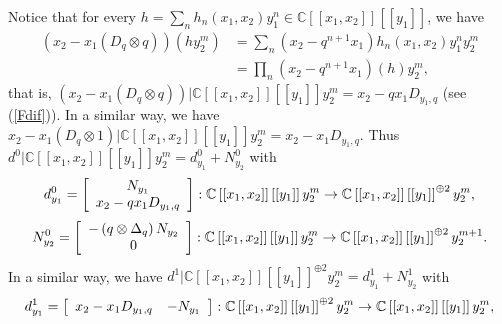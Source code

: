 \documentclass[12pt,reqno]{amsart}%
\theoremstyle{plain}
\numberwithin{theorem}{section} \numberwithin{equation}{section}
\numberwithin{lemma}{section}
\numberwithin{remark}{section}
\numberwithin{example}{section}
\numberwithin{proposition}{section}
\numberwithin{definition}{section}
\numberwithin{corollary}{section}
\begin{document}
Notice that for every $h=\sum_{n}h_{n}\left(  x_{1},x_{2}\right)  y_{1}^{n}%
\in\mathbb{C}\left[  \left[  x_{1},x_{2}\right]  \right]  \left[  \left[
y_{1}\right]  \right]  $, we have
\begin{align*}
\left(  x_{2}-x_{1}\left(  D_{q}\otimes q\right)  \right)  \left(  hy_{2}%
^{m}\right)   &  =\sum_{n}\left(  x_{2}-q^{n+1}x_{1}\right)  h_{n}\left(
x_{1},x_{2}\right)  y_{1}^{n}y_{2}^{m}\\
&  =\prod\limits_{n}\left(  x_{2}-q^{n+1}x_{1}\right)  \left(  h\right)
y_{2}^{m},
\end{align*}
that is, $\left(  x_{2}-x_{1}\left(  D_{q}\otimes q\right)  \right)
|\mathbb{C}\left[  \left[  x_{1},x_{2}\right]  \right]  \left[  \left[
y_{1}\right]  \right]  y_{2}^{m}=x_{2}-qx_{1}D_{y_{1},q}$ (see (\ref{Fdif})).
In a similar way, we have $x_{2}-x_{1}\left(  D_{q}\otimes1\right)
|\mathbb{C}\left[  \left[  x_{1},x_{2}\right]  \right]  \left[  \left[
y_{1}\right]  \right]  y_{2}^{m}=x_{2}-x_{1}D_{y_{1},q}$. Thus $d^{0}%
|\mathbb{C}\left[  \left[  x_{1},x_{2}\right]  \right]  \left[  \left[
y_{1}\right]  \right]  y_{2}^{m}=d_{y_{1}}^{0}+N_{y_{2}}^{0}$ with%
\[
d_{y_{1}}^{0}=\left[
\begin{array}
[c]{c}%
N_{y_{1}}\\
x_{2}-qx_{1}D_{y_{1},q}%
\end{array}
\right]  :\mathbb{C}\left[  \left[  x_{1},x_{2}\right]  \right]  \left[
\left[  y_{1}\right]  \right]  y_{2}^{m}\rightarrow\mathbb{C}\left[  \left[
x_{1},x_{2}\right]  \right]  \left[  \left[  y_{1}\right]  \right]  ^{\oplus
2}y_{2}^{m},
\]%
\[
N_{y_{2}}^{0}=\left[
\begin{array}
[c]{c}%
-\left(  q\otimes\Delta_{q}\right)  N_{y_{2}}\\
0
\end{array}
\right]  :\mathbb{C}\left[  \left[  x_{1},x_{2}\right]  \right]  \left[
\left[  y_{1}\right]  \right]  y_{2}^{m}\rightarrow\mathbb{C}\left[  \left[
x_{1},x_{2}\right]  \right]  \left[  \left[  y_{1}\right]  \right]  ^{\oplus
2}y_{2}^{m+1}.
\]
In a similar way, we have $d^{1}|\mathbb{C}\left[  \left[  x_{1},x_{2}\right]
\right]  \left[  \left[  y_{1}\right]  \right]  ^{\oplus2}y_{2}^{m}=d_{y_{1}%
}^{1}+N_{y_{2}}^{1}$ with
\[
d_{y_{1}}^{1}=\left[
\begin{array}
[c]{cc}%
x_{2}-x_{1}D_{y_{1},q} & -N_{y_{1}}%
\end{array}
\right]  :\mathbb{C}\left[  \left[  x_{1},x_{2}\right]  \right]  \left[
\left[  y_{1}\right]  \right]  ^{\oplus2}y_{2}^{m}\rightarrow\mathbb{C}\left[
\left[  x_{1},x_{2}\right]  \right]  \left[  \left[  y_{1}\right]  \right]
y_{2}^{m},
\]%
\end{document}
